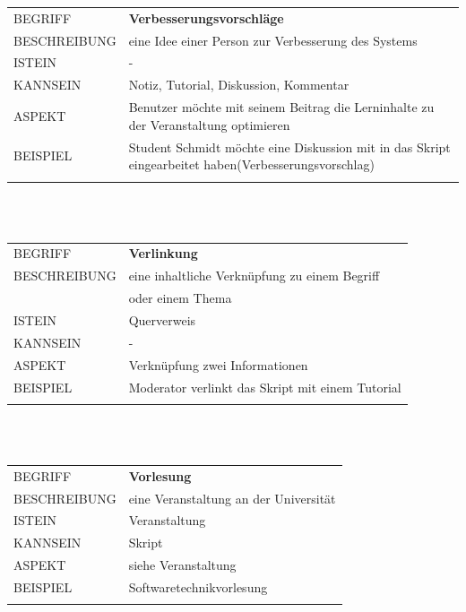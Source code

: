 \documentclass[12pt,a4paper]{article}
\begin{document}
\begin{tabular}{l p{12cm}}
	BEGRIFF 	 & \textbf{Verbesserungsvorschläge} \\ 
	BESCHREIBUNG & eine Idee einer Person zur Verbesserung des Systems\\ 
	ISTEIN   	 & - \\
	KANNSEIN 	 & Notiz, Tutorial, Diskussion, Kommentar\\ 
	ASPEKT   	 & Benutzer möchte mit seinem Beitrag die Lerninhalte zu der 					   Veranstaltung optimieren\\
	BEISPIEL 	 & Student Schmidt möchte eine Diskussion mit in das Skript 					   eingearbeitet haben(Verbesserungsvorschlag)\\\\
	\hline
\end{tabular}\\\\

\begin{tabular}{l p{12cm}} 
	BEGRIFF 	 & \textbf{Verlinkung} \\ 
	BESCHREIBUNG & eine inhaltliche Verknüpfung zu einem Begriff\\
	& oder einem Thema\\ 
	ISTEIN   	 & Querverweis\\
	KANNSEIN 	 & -\\ 
	ASPEKT   	 & Verknüpfung zwei Informationen\\
	BEISPIEL 	 & Moderator verlinkt das Skript mit einem Tutorial\\\\
	\hline
\end{tabular}\\\\ 

\begin{tabular}{l p{12cm}} 
	BEGRIFF 	 & \textbf{Vorlesung} \\ 
	BESCHREIBUNG & eine Veranstaltung an der Universität\\ 
	ISTEIN   	 & Veranstaltung\\
	KANNSEIN 	 & Skript\\ 
	ASPEKT   	 & siehe Veranstaltung\\
	BEISPIEL 	 & Softwaretechnikvorlesung\\\\
	\hline
\end{tabular}\\\\  
\end{document}
